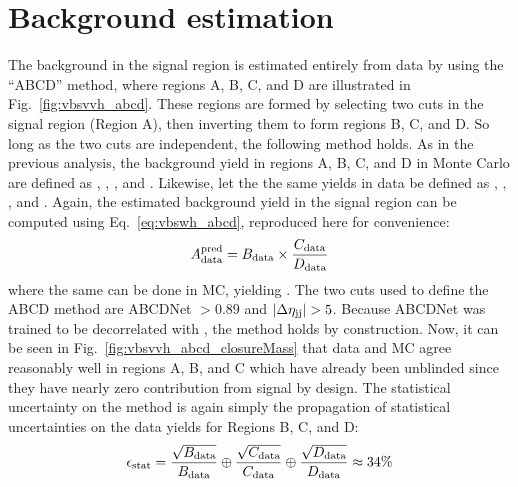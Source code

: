 \section{Background estimation}
The background in the signal region is estimated entirely from data by using the ``ABCD'' method, where regions A, B, C, and D are illustrated in Fig.~\ref{fig:vbsvvh_abcd}. %
These regions are formed by selecting two cuts in the signal region (Region A), then inverting them to form regions B, C, and D. 
So long as the two cuts are independent, the following method holds. 
As in the previous analysis, the background yield in regions A, B, C, and D in Monte Carlo are defined as \AMC, \BMC, \CMC, and \DMC.
Likewise, let the the same yields in data be defined as  \Adata, \Bdata, \Cdata, and \Ddata.
Again, the estimated background yield in the signal region \AdataPred can be computed using Eq.~\ref{eq:vbswh_abcd}, reproduced here for convenience:
\begin{equation*}
    A_{\text{data}}^{\text{pred}} = B_{\text{data}}\times\frac{C_{\text{data}}}{D_{\text{data}}}
\end{equation*}
\noindent where the same can be done in MC, yielding \AMCPred. 
The two cuts used to define the ABCD method are ABCDNet $> 0.89$ and $|\Delta\eta_{\mathrm{j}\mathrm{j}}| > 5$. 
Because ABCDNet was trained to be decorrelated with \detajj, the method holds by construction. 
Now, it can be seen in Fig.~\ref{fig:vbsvvh_abcd_closureMass} that data and MC agree reasonably well in regions A, B, and C which have already been unblinded since they have nearly zero contribution from signal by design. 
The statistical uncertainty \Estat on the method is again simply the propagation of statistical uncertainties on the data yields for Regions B, C, and D:
\begin{equation}\label{eq:vbsvvh_statUnc}
    \Estat = \frac{\sqrt{\Bdata}}{\Bdata} \oplus \frac{\sqrt{\Cdata}}{\Cdata} \oplus \frac{\sqrt{\Ddata}}{\Ddata} \approx 34\% %
\end{equation}

